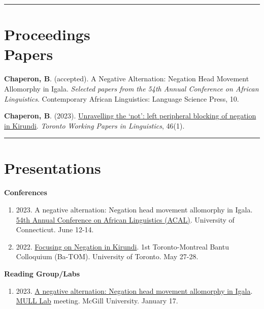\documentclass[margin,line]{resume}
\begin{document}
\begin{resume}
	\vspace{-0.5em}\rule{\textwidth}{0.4pt}


	\section{\mysidestyle Proceedings\\Papers}

	 {\textbf{Chaperon, B}. (accepted). A Negative Alternation: Negation Head Movement Allomorphy in Igala. \textit{Selected papers from the 54th Annual Conference on African Linguistics}. Contemporary African Linguistics: Language Science Press, 10.}

	 {\textbf{Chaperon, B}. (2023). \href{https://twpl.library.utoronto.ca/index.php/twpl/article/view/39257}{Unravelling the `not': left peripheral blocking of negation in Kirundi}. \textit{Toronto Working Papers in Linguistics}, 46(1).}%

	\vspace{-0.3em}\rule{\textwidth}{0.4pt}


	\section{\mysidestyle Presentations}

	\textbf{Conferences}
	\begin{enumerate}[-, leftmargin=1em, topsep=4pt]
		\item[] {2023. A negative alternation: Negation head movement allomorphy in Igala. \href{https://uconnuecs.cventevents.com/event/aef2d257-6a6a-41b5-b83d-2c6efc60aac5/summary}{54th Annual Conference on African Linguistics (ACAL)}. University of Connecticut. June 12-14.}

		\item[] {2022. \href{https://mcling.blogs.mcgill.ca/2022/05/24/mcgill-at-ba-tom-1/}{Focusing on Negation in Kirundi}. 1st Toronto-Montreal Bantu Colloquium (Ba-TOM). University of Toronto. May 27-28.}
	\end{enumerate}

	\textbf{Reading Group/Labs}
	\begin{enumerate}[-, leftmargin=1em, topsep=4pt]
		\item[] {2023. \href{https://mcling.blogs.mcgill.ca/2023/01/15/mull-lab-1-17-brandon-chaperon/}{A negative alternation: Negation head movement allomorphy in Igala}. \href{https://mull-lab.org/}{MULL Lab} meeting. McGill University. January 17.}\newpage


\end{enumerate}
\end{resume}
\end{document}
